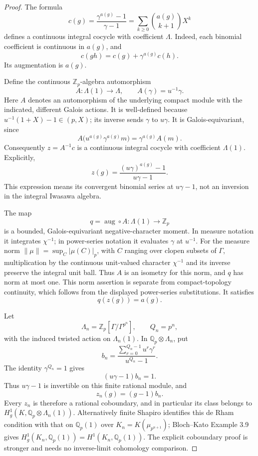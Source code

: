 \begin{proof}
The formula
\[
 c(g)=\frac{\gamma^{a(g)}-1}{\gamma-1}
      =\sum_{k\geq0}\binom{a(g)}{k+1}X^k
\]
defines a continuous integral cocycle with coefficient \(\Lambda\).
Indeed, each binomial coefficient is continuous in \(a(g)\), and
\[
 c(gh)=c(g)+\gamma^{a(g)}c(h).
\]
Its augmentation is \(a(g)\).

Define the continuous \(\mathbb Z_p\)-algebra automorphism
\[
 A:\Lambda(1)\longrightarrow\Lambda,\qquad
 A(\gamma)=u^{-1}\gamma .
\]
Here \(A\) denotes an automorphism of the underlying compact module
with the indicated, different Galois actions.  It is well-defined
because \(u^{-1}(1+X)-1\in(p,X)\); its inverse sends
\(\gamma\) to \(u\gamma\).
It is Galois-equivariant, since
\[
 A\bigl(u^{a(g)}\gamma^{a(g)}m\bigr)
   =\gamma^{a(g)}A(m).
\]
Consequently \(z=A^{-1}c\) is a continuous integral cocycle with
coefficient \(\Lambda(1)\).  Explicitly,
\[
 z(g)=\frac{(u\gamma)^{a(g)}-1}{u\gamma-1}.
\]
This expression means its convergent binomial series at
\(u\gamma-1\), not an inversion in the integral Iwasawa algebra.

The map
\[
 q=\operatorname{aug}\circ A:\Lambda(1)\longrightarrow\mathbb Z_p
\]
is a bounded, Galois-equivariant negative-character moment.
In measure notation it integrates \(\chi^{-1}\); in power-series
notation it evaluates \(\gamma\) at \(u^{-1}\).
For the measure norm
\(\|\mu\|=\sup_C|\mu(C)|_p\), with \(C\) ranging over clopen
subsets of \(\Gamma\), multiplication by the continuous unit-valued
character \(\chi^{-1}\) and its inverse preserve the integral unit ball.
Thus \(A\) is an isometry for this norm, and \(q\) has norm at most one.
This norm assertion is separate from compact-topology continuity,
which follows from the displayed power-series substitutions.
It satisfies
\[
                         q(z(g))=a(g).
\]

Let
\[
 \Lambda_n=\mathbb Z_p[\Gamma/\Gamma^{p^n}],\qquad
 Q_n=p^n,
\]
with the induced twisted action on \(\Lambda_n(1)\).
In \(\mathbb Q_p\otimes\Lambda_n\), put
\[
 b_n=
 \frac{\displaystyle\sum_{r=0}^{Q_n-1}u^r\gamma^r}
      {u^{Q_n}-1}.
\]
The identity \(\gamma^{Q_n}=1\) gives
\[
 (u\gamma-1)b_n=1.
\]
Thus \(u\gamma-1\) is invertible on this finite rational module,
and
\[
 z_n(g)=(g-1)b_n .
\]
Every \(z_n\) is therefore a rational coboundary, and in particular
its class belongs to \(H_g^1(K,\mathbb Q_p\otimes\Lambda_n(1))\).
Alternatively finite Shapiro identifies this de Rham condition
with that on \(\mathbb Q_p(1)\) over
\(K_n=K(\mu_{p^{n+1}})\); Bloch--Kato Example 3.9 gives
\(H_g^1(K_n,\mathbb Q_p(1))=H^1(K_n,\mathbb Q_p(1))\).
The explicit coboundary proof is stronger and needs no inverse-limit
cohomology comparison.


\end{proof}
